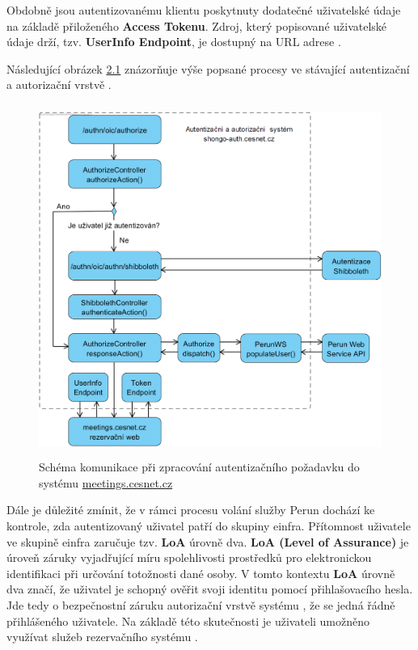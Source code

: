 \documentclass[
  printed, %
  twoside, %
  table,   %
  nolof,     %
  nolot,     %
]{fithesis3}
\begin{document}
Obdobně jsou autentizovanému klientu poskytnuty dodatečné uživatelské údaje na základě přiloženého \textbf{Access Tokenu}. Zdroj, který popisované uživatelské údaje drží, tzv. \textbf{UserInfo Endpoint}, je dostupný na URL adrese .  \par 

Následující obrázek \hyperref[fig:shongoAuthnProcess]{2.1} znázorňuje výše popsané procesy ve stávající autentizační a autorizační vrstvě . 

\begin{figure}[H]
\caption{Schéma komunikace při zpracování autentizačního požadavku do systému \url{meetings.cesnet.cz}} 
\centering
\centerline{\includegraphics[width=12.8cm, height=11.5cm]{pics/shongo-auth-layer-old}} 
\label{fig:shongoAuthnProcess}
\end{figure}
\par 

Dále je důležité zmínit, že v rámci procesu volání služby Perun dochází ke kontrole, zda autentizovaný uživatel patří do skupiny einfra.
Přítomnost uživatele ve skupině einfra zaručuje tzv. \textbf{LoA} úrovně dva. \textbf{LoA (Level of Assurance)} je úroveň záruky vyjadřující míru spolehlivosti prostředků pro elektronickou identifikaci při určování totožnosti dané osoby. V tomto kontextu \textbf{LoA} úrovně dva značí, že uživatel je schopný ověřit svoji identitu pomocí přihlašovacího hesla. Jde tedy o bezpečnostní záruku autorizační vrstvě systému , že se jedná řádně přihlášeného uživatele. Na základě této skutečnosti je uživateli umožněno využívat služeb rezervačního systému .
\end{document}

